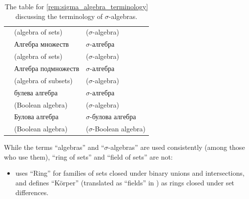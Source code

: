 \begin{remark}
\begin{table}
\begin{tabular}{l l l}
                                                                             & \footnotesize (algebra of sets)                       & \footnotesize (\( \sigma \)-algebra)               \\
      \cite[def. 1.2.1; def. 1.2.2]{Богачёв2003ОсновыТеорииМерыТом1}         & Алгебра множеств                                      & \( \sigma \)-алгебра                               \\
                                                                             & \footnotesize (algebra of sets)                       & \footnotesize (\( \sigma \)-algebra)               \\
      \cite[def. II.1.1; def. II.1.4]{Ширяев2007ВероятностьТом1}             & Алгебра подмножеств                                   & \( \sigma \)-алгебра                               \\
                                                                             & \footnotesize (algebra of subsets)                    & \footnotesize (\( \sigma \)-algebra)               \\
      \cite[def. 3.1; def. 3.3]{Драганов2022ТеорияНаМярката}                 & булева алгебра                                        & \( \sigma \)-алгебра                               \\
                                                                             & \footnotesize (Boolean algebra)                       & \footnotesize (\( \sigma \)-algebra)               \\
      \cite[def. 1.1; def. 1.2]{ДимитровЯнев2007ВероятностиИСтатистика}      & Булова алгебра                                        & \( \sigma \)-булова алгебра                        \\
                                                                             & \footnotesize (Boolean algebra)                       & \footnotesize (\( \sigma \)-Boolean algebra)       \\
      \bottomrule
    \end{tabular}
    \caption{The table for \cref{rem:sigma_algebra_terminology} discussing the terminology of \( \sigma \)-algebras.}\label{tab:rem:sigma_algebra_terminology}
  \end{table}

  While the terms \enquote{algebras} and \enquote{\( \sigma \)-algebras} are used consistently (among those who use them), \enquote{ring of sets} and \enquote{field of sets} are not:
  \begin{itemize}
    \item \Textcite[77]{Hausdorff1935Mengenlehre} uses \enquote{Ring} for families of sets closed under binary unions and intersections, and defines \enquote{K\"{o}rper} (translated as \enquote{fields} in \cite[90]{Hausdorff1962SetTheory}) as rings closed under set differences.


\end{itemize}
\end{remark}
